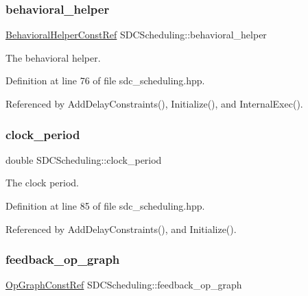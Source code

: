 \subsubsection{\texorpdfstring{behavioral\+\_\+helper}{behavioral\_helper}}
{\footnotesize\ttfamily \hyperlink{behavioral__helper_8hpp_aae973b54cac87eef3b27442aa3e1e425}{Behavioral\+Helper\+Const\+Ref} S\+D\+C\+Scheduling\+::behavioral\+\_\+helper\hspace{0.3cm}{\ttfamily [protected]}}



The behavioral helper. 



Definition at line 76 of file sdc\+\_\+scheduling.\+hpp.



Referenced by Add\+Delay\+Constraints(), Initialize(), and Internal\+Exec().

\mbox{\label{classSDCScheduling_a3790335edbf15cf7529bf6a8c8d5854b}} 
\subsubsection{\texorpdfstring{clock\+\_\+period}{clock\_period}}
{\footnotesize\ttfamily double S\+D\+C\+Scheduling\+::clock\+\_\+period\hspace{0.3cm}{\ttfamily [protected]}}



The clock period. 



Definition at line 85 of file sdc\+\_\+scheduling.\+hpp.



Referenced by Add\+Delay\+Constraints(), and Initialize().

\mbox{\label{classSDCScheduling_a81eb66c6269c6d47e758cdd9cb5d0394}} 
\subsubsection{\texorpdfstring{feedback\+\_\+op\+\_\+graph}{feedback\_op\_graph}}
{\footnotesize\ttfamily \hyperlink{op__graph_8hpp_a9a0b240622c47584bee6951a6f5de746}{Op\+Graph\+Const\+Ref} S\+D\+C\+Scheduling\+::feedback\+\_\+op\+\_\+graph\hspace{0.3cm}{\ttfamily [protected]}}




